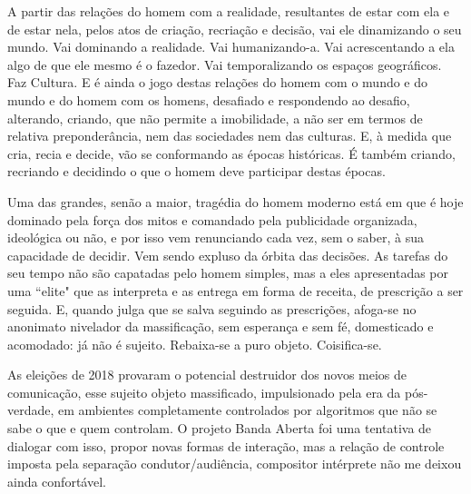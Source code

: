  \begin{citacao}
 
   A partir das relações do homem com a realidade, resultantes de estar com ela e de estar nela, pelos atos de criação, recriação e decisão, vai ele dinamizando o seu mundo. Vai dominando a realidade. Vai humanizando-a. Vai acrescentando a ela algo de que ele mesmo é o fazedor. Vai temporalizando os espaços geográficos. Faz Cultura. E é ainda o jogo destas relações do homem com o mundo e do mundo e do homem com os homens, desafiado e respondendo ao desafio, alterando, criando, que não permite a imobilidade, a não ser em termos de relativa preponderância, nem das sociedades nem das culturas. E, à medida que cria, recia e decide, vão se conformando as épocas históricas. É também criando, recriando e decidindo o que o homem deve participar destas épocas. \cite[60]{Freire2015}
    \end{citacao} 

   \begin{citacao}
   Uma das grandes, senão a maior, tragédia do homem moderno está em que é hoje dominado pela força dos mitos e comandado pela publicidade organizada, ideológica ou não, e por isso vem renunciando cada vez, sem o saber, à sua capacidade de decidir. Vem sendo expluso da órbita das decisões. As tarefas do seu tempo não são capatadas pelo homem simples, mas a eles apresentadas por uma ``elite" que as interpreta e as entrega em forma de receita, de prescrição a ser seguida. E, quando julga que se salva seguindo as prescrições, afoga-se no anonimato nivelador da massificação, sem esperança e sem fé, domesticado e acomodado: já não é sujeito. Rebaixa-se a puro objeto. Coisifica-se. \cite[60]{Freire2015}
 \end{citacao} 

As eleições de 2018 provaram o potencial destruidor dos novos meios de comunicação, esse sujeito objeto massificado, impulsionado pela era da pós-verdade, em ambientes completamente controlados por algoritmos que não se sabe o que e quem controlam. O projeto Banda Aberta foi uma tentativa de dialogar com isso, propor novas formas de interação, mas a relação de controle imposta pela separação condutor/audiência, compositor intérprete não me deixou ainda confortável. 

